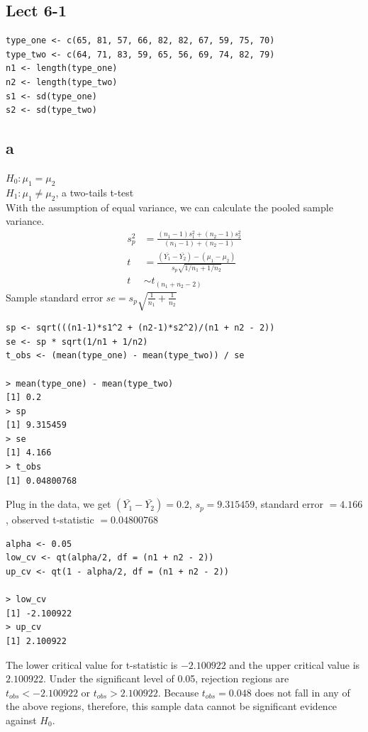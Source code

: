 \documentclass[11pt,letterpaper]{article}
\begin{document}
\subsection*{Lect 6-1}
\begin{verbatim}
type_one <- c(65, 81, 57, 66, 82, 82, 67, 59, 75, 70)
type_two <- c(64, 71, 83, 59, 65, 56, 69, 74, 82, 79)
n1 <- length(type_one)
n2 <- length(type_two)
s1 <- sd(type_one)
s2 <- sd(type_two)
\end{verbatim}
\subsection*{a}
\noindent $H_0: \mu_1 = \mu_2$ \\
\noindent $H_1: \mu_1 \neq \mu_2$, a two-tails t-test \\

\noindent With the assumption of equal variance, we can calculate the pooled sample variance. 
\begin{align*}
s_p^2 &= \frac{(n_1 - 1)s_1^2 + (n_2 - 1)s_2^2}{(n_1 - 1) +  (n_2 - 1)} \\
t &= \frac{(\bar{Y_1} - \bar{Y_2}) - (\mu_1 - \mu_2)}{s_p \sqrt{1/n_1 + 1/n_2}} \\
t & \sim t_{(n_1 + n_2 - 2)}
\end{align*}
\noindent Sample standard error $se = s_p\sqrt{\frac{1}{n_1} + \frac{1}{n_2}}$  
\begin{verbatim}
sp <- sqrt(((n1-1)*s1^2 + (n2-1)*s2^2)/(n1 + n2 - 2))
se <- sp * sqrt(1/n1 + 1/n2)
t_obs <- (mean(type_one) - mean(type_two)) / se

> mean(type_one) - mean(type_two)
[1] 0.2
> sp
[1] 9.315459
> se
[1] 4.166
> t_obs
[1] 0.04800768
\end{verbatim}

\noindent Plug in the data, we get $(\bar{Y_1} - \bar{Y_2}) = 0.2$, $s_p = 9.315459$, standard error $= 4.166$, observed t-statistic $= 0.04800768$

\begin{verbatim}
alpha <- 0.05
low_cv <- qt(alpha/2, df = (n1 + n2 - 2)) 
up_cv <- qt(1 - alpha/2, df = (n1 + n2 - 2))

> low_cv
[1] -2.100922
> up_cv
[1] 2.100922
\end{verbatim}

\noindent The lower critical value for t-statistic is $-2.100922$ and the upper critical value is $2.100922$. Under the significant level of 0.05, rejection regions are $t_{obs} < -2.100922$ or $t_{obs} > 2.100922$. Because $t_{obs} = 0.048$ does not fall in any of the above regions, therefore, this sample data cannot be significant evidence against $H_0$.
\end{document}
